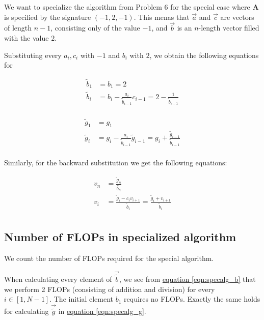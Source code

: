 \documentclass[english,notitlepage]{article}  %
\begin{document}
    We want to specialize the algorithm from Problem 6 for the special case where $\boldsymbol{A}$ is specified by the signature $(-1, 2, -1)$. This menas that $\vec{a}$ and $\vec{c}$ are vectors of length $n-1$, consisting only of the value $-1$, and $\vec{b}$ is an $n$-length vector filled with the value $2$.

    Substituting every $a_i, c_i$ with $-1$ and $b_i$ with $2$, we obtain the following equations for

    \begin{equation}
      \begin{split}
        \tilde{b}_1 &= b_1 = 2 \\
        \tilde{b}_i &= b_i - \frac{a_i}{\tilde{b}_{i-1}} c_{i-1} = 2 - \frac{1}{\tilde{b}_{i-1}} \\ \label{eqn:specalg_b}
       \end{split}
    \end{equation}

    \begin{equation}
      \begin{split}
        \tilde{g}_1 &= g_1 \\
        \tilde{g}_i &= g_i - \frac{a_i}{\tilde{b}_{i-1}} \tilde{g}_{i-1} = g_i + \frac{\tilde{g}_{i-1}}{\tilde{b}_{i-1}} \\ \label{eqn:specalg_g}
       \end{split}
    \end{equation}

    Similarly, for the backward substitution we get the following equations:

    \begin{equation}
      \begin{split}
        v_n &= \frac{\tilde{g}_n}{\tilde{b_n}} \\
        v_i &= \frac{\tilde{g}_i - c_i v_{i+1}}{\tilde{b}_i} = \frac{\tilde{g}_i + v_{i+1}}{\tilde{b}_i} \\ \label{eqn:specalg_v}
       \end{split}
    \end{equation}

  \subsection*{Number of FLOPs in specialized algorithm}

    We count the number of FLOPs required for the special algorithm.

    When calculating every element of $\vec{\tilde{b}}$, we see from \hyperref[eqn:specalg_b]{equation \ref*{eqn:specalg_b}}  that we perform 2 FLOPs (consisting of addition and division) for every $i \in [1, N-1]$. The initial element $b_1$ requires no FLOPs. Exactly the same holds for calculating $\vec{\tilde{g}}$ in \hyperref[eqn:specalg_g]{equation \ref*{eqn:specalg_g}}.
\end{document}
